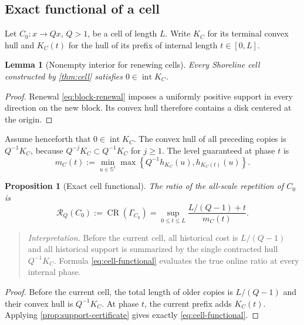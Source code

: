 \documentclass[10pt,a4paper]{article}
\newtheorem{lemma}[lemma]{Lemma}
\newtheorem{proposition}[proposition]{Proposition}
\theoremstyle{definition}
\theoremstyle{remark}
\DeclareMathOperator{\CR}{CR}
\newcommand{\Sph}{\mathbb{S}}
\newcommand{\cellratio}{\mathcal{R}}
\begin{document}
\subsection{Exact functional of a cell}
Let $C_0:x\to Qx$, $Q>1$, be a cell of length $L$. Write $K_C$ for its terminal convex hull and $K_C(t)$ for the hull of its prefix of internal length $t\in[0,L]$.

\begin{lemma}[Nonempty interior for renewing cells]
\label{lem:renewing-interior}
Every Shoreline cell constructed by \cref{thm:cell} satisfies $0\in\operatorname{int}K_C$.
\end{lemma}

\begin{proof}
Renewal \eqref{eq:block-renewal} imposes a uniformly positive support in every direction on the new block. Its convex hull therefore contains a disk centered at the origin.
\end{proof}

Assume henceforth that $0\in\operatorname{int}K_C$. The convex hull of all preceding copies is $Q^{-1}K_C$, because $Q^{-j}K_C\subset Q^{-1}K_C$ for $j\ge1$. The level guaranteed at phase $t$ is
\begin{equation}
m_C(t):=\min_{u\in\Sph^1}
\max\left\{Q^{-1}h_{K_C}(u),h_{K_C(t)}(u)\right\}.
\label{eq:cell-level}
\end{equation}

\begin{proposition}[Exact cell functional]
\label{prop:cell-functional}
The ratio of the all-scale repetition of $C_0$ is
\begin{equation}
\cellratio_Q(C_0):=\CR(\Gamma_{C_0})
=\sup_{0\le t\le L}
\frac{L/(Q-1)+t}{m_C(t)}.
\label{eq:cell-functional}
\end{equation}
\end{proposition}

\begin{quote}\small
\textit{Interpretation.} Before the current cell, all historical cost is $L/(Q-1)$ and all historical support is summarized by the single contracted hull $Q^{-1}K_C$. Formula \eqref{eq:cell-functional} evaluates the true online ratio at every internal phase.
\end{quote}

\begin{proof}
Before the current cell, the total length of older copies is $L/(Q-1)$ and their convex hull is $Q^{-1}K_C$. At phase $t$, the current prefix adds $K_C(t)$. Applying \cref{prop:support-certificate} gives exactly \eqref{eq:cell-functional}.
\end{proof}
\end{document}

